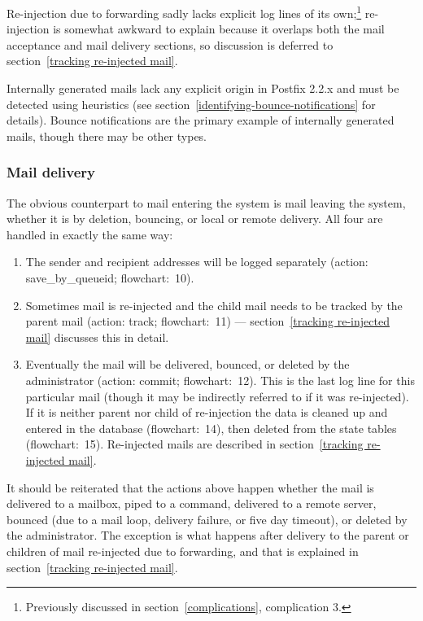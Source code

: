 \documentclass[a4paper,12pt,draft]{article}
\begin{document}
Re-injection due to forwarding sadly lacks explicit log lines of its
own;\footnote{Previously discussed in section~\ref{complications},
complication 3.} re-injection is somewhat awkward to explain because it
overlaps both the mail acceptance and mail delivery sections, so discussion
is deferred to section~\ref{tracking re-injected mail}.

Internally generated mails lack any explicit origin in Postfix 2.2.x and
must be detected using heuristics (see
section~\ref{identifying-bounce-notifications} for details).  Bounce
notifications are the primary example of internally generated mails, though
there may be other types.

\subsubsection{Mail delivery}

\label{mail-delivery}

The obvious counterpart to mail entering the system is mail leaving the
system, whether it is by deletion, bouncing, or local or remote delivery.
All four are handled in exactly the same way:

\begin{enumerate}

    \item The sender and recipient addresses will be logged separately
        (action: save\_by\_queueid; flowchart:~10).

    \item Sometimes mail is re-injected and the child mail needs to be
        tracked by the parent mail (action: track; flowchart:~11) ---
        section~\ref{tracking re-injected mail} discusses this in detail.

    \item Eventually the mail will be delivered, bounced, or deleted by the
        administrator (action: commit; flowchart:~12).  This is the last
        log line for this particular mail (though it may be indirectly
        referred to if it was re-injected).  If it is neither parent nor
        child of re-injection the data is cleaned up and entered in the
        database (flowchart:~14), then deleted from the state tables
        (flowchart:~15).  Re-injected mails are described in
        section~\ref{tracking re-injected mail}.

\end{enumerate}

It should be reiterated that the actions above happen whether the mail is
delivered to a mailbox, piped to a command, delivered to a remote server,
bounced (due to a mail loop, delivery failure, or five day timeout), or
deleted by the administrator.  The exception is what happens after delivery
to the parent or children of mail re-injected due to forwarding, and that
is explained in section~\ref{tracking re-injected mail}.
\end{document}

